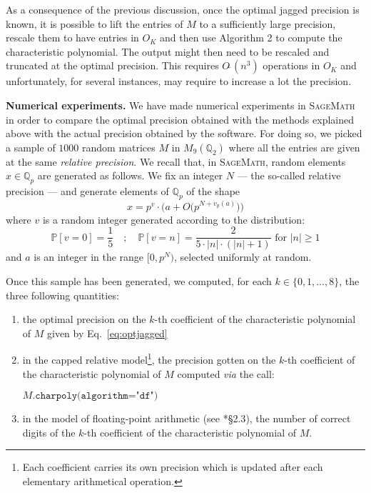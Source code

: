 \documentclass{sig-alternate-05-2015}
\newcommand{\Q}{\mathbb Q}
\newcommand{\softO}{O\tilde{~}}
\begin{document}
\begin{rem} \label{rem:lift_for_optimal}
As a consequence of the previous discussion, once the optimal jagged 
precision is known, it is possible to lift the entries of $M$ to a sufficiently
large precision, rescale them to have entries in $O_K$
and then use Algorithm 2 to
compute the characteristic polynomial.
The output might then need to be rescaled and
 truncated at the optimal precision. 
This requires $\softO(n^3)$ operations in $O_K$ 
and unfortunately, for several instances, may require to increase a lot the precision.
\end{rem}

\medskip

\noindent
{\bf Numerical experiments.}
We have made numerical experiments in \textsc{SageMath}~\cite{sage}
in order to compare the optimal precision obtained with the methods
explained above with the actual precision obtained by the software.
For doing so, we picked a sample of $1000$ random matrices $M$ in 
$M_9(\Q_2)$ where all the entries are given at the same \emph{relative
precision}.
We recall that, in \textsc{SageMath}, random elements $x \in \Q_p$ are 
generated as follows. We fix an integer $N$ --- the so-called relative
precision --- and generate elements of $\Q_p$ of the shape
$$x = p^v \cdot \big(a + O\big(p^{N+v_p(a)}\big)\big)$$
where $v$ is a random integer generated according to the distribution:
$$\mathbb P [v = 0] = \frac 1 5 \quad ; \quad
\mathbb P [v = n] = \frac 2 {5\cdot |n| \cdot (|n|+1)} \text{ for }
|n| \geq 1$$
and $a$ is an integer in the range $[0, p^N)$, selected uniformly at random.

Once this sample has been generated, we computed, for each $k \in \{0, 
1, \ldots, 8\}$, the three following quantities:

\vspace{-2mm}

\begin{enumerate}[$\bullet$]
\renewcommand{\itemsep}{0pt}
\item the optimal precision on the $k$-th coefficient of the 
characteristic polynomial of $M$ given by Eq.~\eqref{eq:optjagged}
\item in the capped relative model\footnote{Each 
coefficient carries its own precision which is updated after each 
elementary arithmetical operation.},
the precision gotten on the $k$-th coefficient of the 
characteristic polynomial of $M$ computed \emph{via} the call:

\hfill$M\texttt{.charpoly(algorithm="df")}$\hfill\null

\item in the model of floating-point arithmetic (see 
\cite{caruso:17a}*{\S 2.3}), the number of correct digits of the 
$k$-th coefficient of the characteristic polynomial of $M$.
\end{enumerate}
\end{document}
